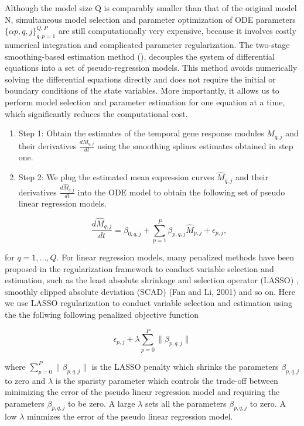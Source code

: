 Although the model size Q is comparably smaller than that of the original model N, simultaneous model selection and parameter optimization of ODE parameters $\{\alpha{p,q,j}\}_{q,p=1}^{Q,P}$ are still computationally very expensive, because it involves costly numerical integration and complicated parameter regularization. The two-stage smoothing-based estimation method (\cite{voit2004decoupling,liang2008parameter}), decouples the system of differential equations into a set of pseudo-regression models.  This method avoids numerically solving the differential equations directly and does not require the initial or boundary conditions of the state variables. More importantly, it allows us to perform model selection and parameter estimation for one equation at a time, which significantly reduces the computational cost.



\begin{enumerate}

   \item Step 1: Obtain the estimates of the temporal gene response modules $M_{q,j}$ and their derivatives $\frac{dM_{q,j}}{dt}$ using the smoothing splines estimates obtained in step one.
   \item Step 2: We plug the estimated mean expression curves $\hat{M}_{q,j}$ and their derivatives $\frac{d\hat{M}_{q,j}}{dt}$ into the ODE model to obtain the following set of pseudo linear regression models.

    \begin{equation} \frac{d\hat{M}_{q,j}}{dt} = \beta_{0,q,j} + \sum_{p=1}^{P} \beta_{p,q,j}\hat{M}_{p,j} + \epsilon_{p,j}, \end{equation}
\end{enumerate}

for $q=1,...,Q$. For linear regression models, many penalized methods have been proposed in the regularization framework to conduct variable selection and estimation, such as the least absolute shrinkage and selection operator (LASSO) \citep{tibshirani1996regression}, smoothly clipped absolute deviation (SCAD) (Fan and Li, 2001) and so on. Here we use LASSO regularization to conduct variable selection and estimation using the the follwing following penalized objective function

\begin{equation} \epsilon_{p,j} + \lambda \sum_{p=0}^{P} \| \beta_{p,q,j} \| \end{equation}

where $\sum_{p=0}^{P} \| \beta_{p,q,j} \|$ is the LASSO penalty which shrinks the parameters $\beta_{p,q,j}$ to zero and $\lambda$ is the sparisty parameter which controls the trade-off between minimizing the error of the pseudo linear regression model and requiring the parameters $\beta_{p,q,j}$ to be zero. A large $\lambda$ sets all the parameters $\beta_{p,q,j}$ to zero. A low $\lambda$ minmizes the error of the pseudo linear regression model.

